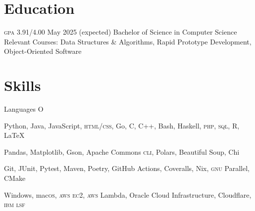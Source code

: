 \section{Education}
\begin{doutline}
     \textsc{gpa} 3.91/4.00
    \hfill May 2025 (expected)
        \2 Bachelor of Science in Computer Science
        \2 Relevant Courses: Data Structures \& Algorithms, Rapid Prototype Development, Object-Oriented Software
\end{doutline}

\section{Skills}
\begin{labeling}{Languages O}
    \item [Languages] Python, Java, JavaScript, \textsc{html/css}, Go, C, C++, Bash, Haskell, \textsc{php}, \textsc{sql}, R, \LaTeX
    \item [Libraries] Pandas, Matplotlib, Gson, Apache Commons \textsc{cli}, Polars, Beautiful Soup, Chi
    \item [Tools] Git, JUnit, Pytest, Maven, Poetry, GitHub Actions, Coveralls, Nix, \textsc{gnu} Parallel, CMake
    \item [Platforms] Windows, mac\textsc{os}, \textsc{aws ec2}, \textsc{aws} Lambda, Oracle Cloud Infrastructure, Cloudflare, \textsc{ibm lsf}
\end{labeling}

